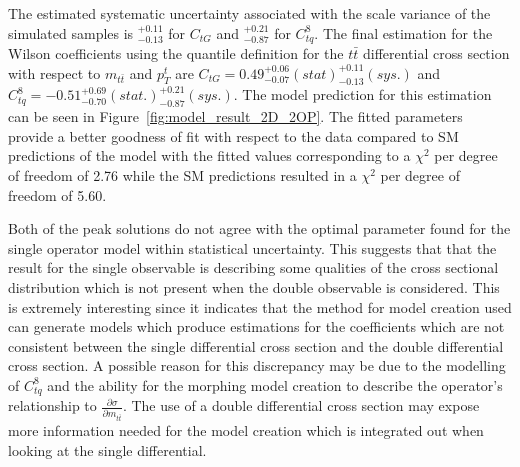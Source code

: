 \documentclass[a4paper,11pt]{article}
\begin{document}
The estimated systematic uncertainty associated with the scale variance of the simulated samples is $^{+0.11}_{-0.13}$ for $C_{tG}$ and $^{+0.21}_{-0.87}$ for $C_{tq}^{8}$. 
The final estimation for the Wilson coefficients using the quantile definition for the $t\bar{t}$ differential cross section with respect to $m_{t\bar{t}}$ and $p_{T}^{t}$ are $C_{tG} = 0.49_{-0.07}^{+0.06}(stat) ^{+0.11}_{-0.13} (sys.)$ and $C_{tq}^{8}=-0.51_{-0.70}^{+0.69} (stat.) ^{+0.21}_{-0.87} (sys.)$.
The model prediction for this estimation can be seen in Figure~\ref{fig:model_result_2D_2OP}.
The fitted parameters provide a better goodness of fit with respect to the data compared to SM predictions of the model with the fitted values corresponding to a $\chi^{2}$ per degree of freedom of 2.76 while the SM predictions resulted in a $\chi^{2}$ per degree of freedom of 5.60.

Both of the peak solutions do not agree with the optimal parameter found for the single operator model within statistical uncertainty.
This suggests that that the result for the single observable is describing some qualities of the cross sectional distribution which is not present when the double observable is considered.
This is extremely interesting since it indicates that the method for model creation used can generate models which produce estimations for the coefficients which are not consistent between the single differential cross section and the double differential cross section.
A possible reason for this discrepancy may be due to the modelling of $C_{tq}^{8}$ and the ability for the morphing model creation to describe the operator's relationship to $\frac{\partial \sigma}{\partial m_{t\bar{t}}}$.
The use of a double differential cross section may expose more information needed for the model creation which is integrated out when looking at the single differential.
\end{document}
